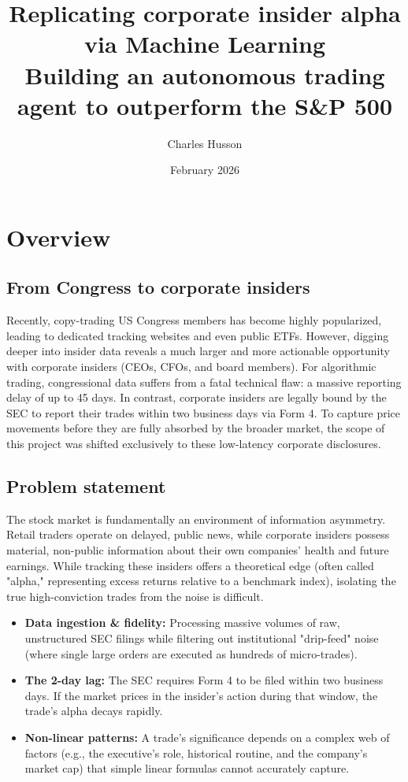 \documentclass{article}
\title{\textbf{Replicating corporate insider alpha via Machine Learning}\\
\large Building an autonomous trading agent to outperform the S\&P 500}
\author{Charles Husson}
\date{February 2026}
\begin{document}
\maketitle
\thispagestyle{fancy}

\section{Overview}

\subsection{From Congress to corporate insiders}
Recently, copy-trading US Congress members has become highly popularized, leading to dedicated tracking websites and even public ETFs. However, digging deeper into insider data reveals a much larger and more actionable opportunity with corporate insiders (CEOs, CFOs, and board members). For algorithmic trading, congressional data suffers from a fatal technical flaw: a massive reporting delay of up to 45 days. In contrast, corporate insiders are legally bound by the SEC to report their trades within two business days via Form 4. To capture price movements before they are fully absorbed by the broader market, the scope of this project was shifted exclusively to these low-latency corporate disclosures.

\subsection{Problem statement}
The stock market is fundamentally an environment of information asymmetry. Retail traders operate on delayed, public news, while corporate insiders possess material, non-public information about their own companies' health and future earnings. While tracking these insiders offers a theoretical edge (often called "alpha," representing excess returns relative to a benchmark index), isolating the true high-conviction trades from the noise is difficult.
\begin{itemize}
    \item \textbf{Data ingestion \& fidelity:} Processing massive volumes of raw, unstructured SEC filings while filtering out institutional "drip-feed" noise (where single large orders are executed as hundreds of micro-trades).
    \item \textbf{The 2-day lag:} The SEC requires Form 4 to be filed within two business days. If the market prices in the insider's action during that window, the trade's alpha decays rapidly.
    \item \textbf{Non-linear patterns:} A trade's significance depends on a complex web of factors (e.g., the executive's role, historical routine, and the company's market cap) that simple linear formulas cannot accurately capture.
\end{itemize}
\end{document}
